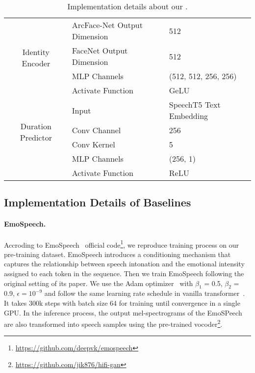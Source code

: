 \begin{table}[h]
\begin{tabular}{@{}cll@{}}
\multirow{4}{*}{Identity Encoder} 
                            & ArcFace-Net Output Dimension &  512          \\
                              & FaceNet Output Dimension & 512                              \\
                              & MLP Channels &  (512, 512, 256, 256)                      \\
                              & Activate Function &  GeLU                  \\ \midrule
\multirow{4}{*}{Duration Predictor} 
                        & Input &  SpeechT5 Text Embedding           \\
                          & Conv Channel & 256                              \\
                          & Conv Kernel & 5                              \\
                          & MLP Channels &  (256, 1)                      \\
                          & Activate Function &  ReLU                  \\ \bottomrule
\end{tabular}
\caption{Implementation details about our \methodname.}
\label{tab:model_detail}
\end{table}



\subsection{Implementation Details of Baselines}

\paragraph{EmoSpeech.~~\xspace}
Accroding to EmoSpeech~\cite{emospeech:conf/ssw/DiatlovaS23} official code\footnote{\href{https://github.com/deepvk/emospeech}{https://github.com/deepvk/emospeech}}, we reproduce training process on our pre-training dataset. 
EmoSpeech introduces a conditioning mechanism that captures the relationship between speech intonation and the emotional intensity assigned to each token in the sequence.
Then we train EmoSpeech following the original setting of its paper. We use the Adam optimizer~\cite{adam/KingmaB14} with $\beta_1$ = 0.5, $\beta_2$ = 0.9, $\epsilon = 10^{-9}$ and follow the same learning rate schedule in vanilla transformer~\cite{attentionallyou/VaswaniSPUJGKP17}. It takes 300k steps with batch size 64 for training until convergence in a single GPU. In the inference process, the output mel-spectrograms of the EmoSPeech are also transformed into speech samples using the pre-trained vocoder\footnote{\href{https://github.com/jik876/hifi-gan}{https://github.com/jik876/hifi-gan}}.


